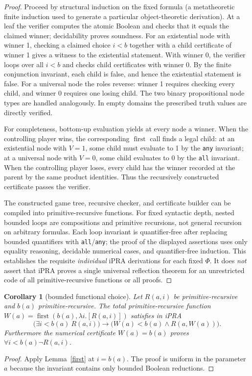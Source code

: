 \documentclass[11pt]{article}
\newtheorem{corollary}[theorem]{Corollary}
\begin{document}
\begin{proof}
Proceed by structural induction on the fixed formula (a metatheoretic finite induction used to generate a particular object-theoretic derivation). At a leaf the verifier computes the atomic Boolean and checks that it equals the claimed winner; decidability proves soundness. For an existential node with winner 1, checking a claimed choice $i<b$ together with a child certificate of winner 1 gives a witness to the existential statement. With winner 0, the verifier loops over all $i<b$ and checks child certificates with winner 0. By the finite conjunction invariant, each child is false, and hence the existential statement is false. For a universal node the roles reverse: winner 1 requires checking every child, and winner 0 requires one losing child. The two binary propositional node types are handled analogously. In empty domains the prescribed truth values are directly verified.

For completeness, bottom-up evaluation yields at every node a winner. When the controlling player wins, the corresponding $\operatorname{first}$ call finds a legal child: at an existential node with $V=1$, some child must evaluate to 1 by the \texttt{any} invariant; at a universal node with $V=0$, some child evaluates to 0 by the \texttt{all} invariant. When the controlling player loses, every child has the winner recorded at the parent by the same product identities. Thus the recursively constructed certificate passes the verifier.

The constructed game tree, recursive checker, and certificate builder can be compiled into primitive-recursive functions. For fixed syntactic depth, nested bounded loops are compositions and primitive recursions, not general recursion on arbitrary formulas. Each loop invariant is quantifier-free after replacing bounded quantifiers with \texttt{all}/\texttt{any}; the proof of the displayed assertions uses only equality reasoning, decidable numerical cases, and quantifier-free induction. This establishes the requisite \emph{individual} iPRA derivations for each fixed $\Phi$. It does \emph{not} assert that iPRA proves a single universal reflection theorem for an unrestricted code of all primitive-recursive functions or all proofs.
\end{proof}

\begin{corollary}[bounded functional choice]\label{choice}
Let $R(a,i)$ be primitive-recursive and $b(a)$ primitive-recursive. The total primitive-recursive function $W(a)=\operatorname{first}(b(a),\lambda i.[R(a,i)])$ satisfies in iPRA
\[\bigl(\exists i<b(a)\ R(a,i)\bigr)\to\bigl(W(a)<b(a)\wedge R(a,W(a))\bigr).\]
Furthermore the numerical certificate $W(a)=b(a)$ proves $\forall i<b(a)\neg R(a,i)$.
\end{corollary}
\begin{proof}
Apply Lemma~\ref{first} at $i=b(a)$. The proof is uniform in the parameter $a$ because the invariant contains only bounded Boolean reductions.
\end{proof}
\end{document}
